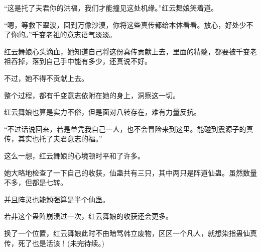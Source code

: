 \begin{this_body}
“这是托了夫君你的洪福，我们才能撞见这处机缘。”红云舞娘笑着道。

“嗯，等救下翠波，回到万像沙漠，你将这些真传都给本体看看。放心，好处少不了你的。”千变老祖的意志语气淡淡。

红云舞娘心头滴血，她知道自己将这份真传贡献上去，里面的精髓，都要被千变老祖吞掉，落到自己手中能有多少，还真说不好。

不过，她不得不贡献上去。

整个过程，都有千变意志依附在她的身上，洞察这一切。

红云舞娘也算是实力不俗，但是面对八转存在，难有力量反抗。

“不过话说回来，若是单凭我自己一人，也不会冒险来到这里。能碰到震源子的真传，其实也托了夫君意志的福。”

这么一想，红云舞娘的心境顿时平和了许多。

她大略地检查了一下自己的收获，仙蛊共有三只，其中两只是阵道仙蛊。虽然数量不多，但都是七转。

并且阵灵也能勉强算是半个仙蛊。

若非这个蛊阵崩溃过一次，红云舞娘的收获还会更多。

换了一个位置，红云舞娘此时不由暗骂韩立废物，区区一个凡人，就想染指蛊仙真传，死了也是活该！(未完待续。)

\end{this_body}


